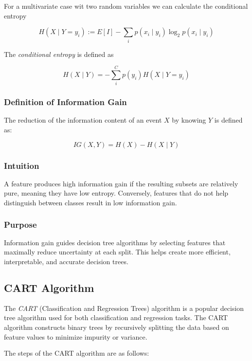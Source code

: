 For a multivariate case wit two random variables we can calculate the conditional entropy 

\[
    H(X \mid Y = y_i) := E[I] - \sum_{i} p(x_i \mid y_i) \log_2 p(x_i \mid y_i)
\]

The \emph{conditional entropy} is defined as 

\[
    H(X \mid Y) = - \sum_{i}^C p(y_i) H(X \mid Y = y_i)
\]


\subsubsection{Definition of Information Gain}

The reduction of the information content of an event \(X\) by knowing \(Y\) is defined as:

\[
    IG(X, Y) = H(X) - H(X \mid Y)
\]

\subsubsection{Intuition}

A feature produces high information gain if the resulting subsets are relatively pure, meaning they have low entropy. Conversely, features that do not help distinguish 
between classes result in low information gain.

\subsubsection{Purpose}

Information gain guides decision tree algorithms by selecting features that maximally reduce uncertainty at each split. This helps create more efficient, 
interpretable, and accurate decision trees.

\subsection{CART Algorithm}

The \emph{CART} (Classification and Regression Trees) algorithm is a popular decision tree algorithm used for both classification and regression tasks.
The CART algorithm constructs binary trees by recursively splitting the data based on feature values to minimize impurity or variance.

The steps of the CART algorithm are as follows:

